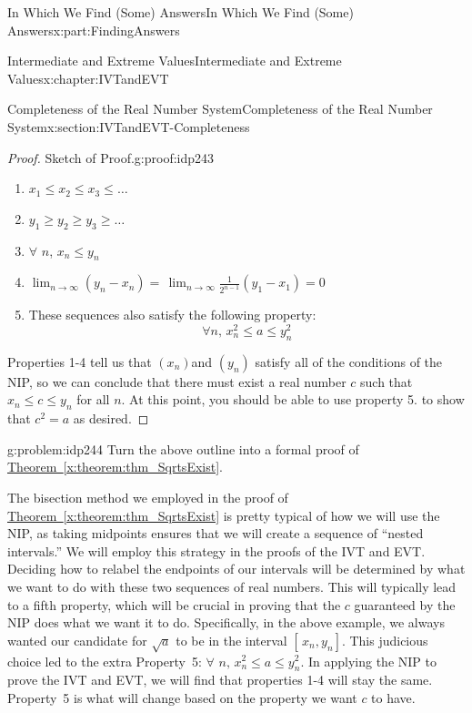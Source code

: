 \documentclass[oneside,10pt,]{book}
\newcommand{\xreffont}{\relax}
\numberwithin{equation}{section}
\begin{document}
\begin{partptx}{In Which We Find (Some) Answers}{}{In Which We Find (Some) Answers}{}{}{x:part:FindingAnswers}
\begin{chapterptx}{Intermediate and Extreme Values}{}{Intermediate and Extreme Values}{}{}{x:chapter:IVTandEVT}
\begin{sectionptx}{Completeness of the Real Number System}{}{Completeness of the Real Number System}{}{}{x:section:IVTandEVT-Completeness}
\begin{proof}{Sketch of Proof.}{g:proof:idp243}
\begin{enumerate}
\item{}\(\displaystyle x_1\leq x_2\leq x_3\leq\ldots\)%
\item{}\(\displaystyle y_1\geq y_2\geq y_3\geq\ldots\)%
\item{}\(\forall\) \(n\), \(x_n\leq y_n\)%
\item{}\(\displaystyle \lim_{n\rightarrow\infty}\left(y_n-x_n\right)=\,\lim_{n\rightarrow\infty}\frac{1}{2^{n-1}}\left(y_1-x_1\right)=0\)%
\item{}These sequences also satisfy the following property:%
\begin{equation*}
\forall n,\,x_n^2\leq a\leq y_n^2
\end{equation*}
%
\end{enumerate}
%
\par
Properties 1-4 tell us that \(\left(x_n\right)\)and \(\left(y_n\right)\) satisfy all of the conditions of the NIP, so we can conclude that there must exist a real number \(c\) such that \(x_n\leq c\leq y_n\) for all \(n\). At this point, you should be able to use property 5. to show that \(c^2=a\) as desired.%
\end{proof}
\begin{problem}{}{g:problem:idp244}%
 Turn the above outline into a formal proof of \hyperref[x:theorem:thm_SqrtsExist]{Theorem~{\xreffont\ref{x:theorem:thm_SqrtsExist}}}.%
\end{problem}
The bisection method we employed in the proof of \hyperref[x:theorem:thm_SqrtsExist]{Theorem~{\xreffont\ref{x:theorem:thm_SqrtsExist}}} is pretty typical of how we will use the NIP, as taking midpoints ensures that we will create a sequence of ``nested intervals.'' We will employ this strategy in the proofs of the IVT and EVT. Deciding how to relabel the endpoints of our intervals will be determined by what we want to do with these two sequences of real numbers. This will typically lead to a fifth property, which will be crucial in proving that the \(c\) guaranteed by the NIP does what we want it to do. Specifically, in the above example, we always wanted our candidate for \(\sqrt{a}\) to be in the interval \([\,x_n,y_n]\). This judicious choice led to the extra Property~5: \(\forall\) \(n,\,x_n^2\leq a\leq y_n^2\). In applying the NIP to prove the IVT and EVT, we will find that properties 1-4 will stay the same. Property~5 is what will change based on the property we want \(c\) to have.%
\par

\end{sectionptx}
\end{chapterptx}
\end{partptx}
\end{document}
